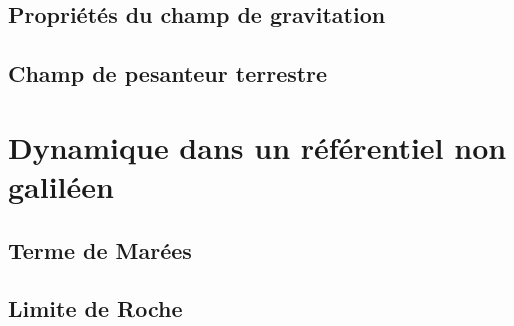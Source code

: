 \documentclass[10pt]{beamer}
\begin{document}
\subsection{Propriétés du champ de gravitation}
\subsection{Champ de pesanteur terrestre}

\section{Dynamique dans un référentiel non galiléen}
\subsection{Terme de Marées}
\subsection{Limite de Roche}


\end{document}
